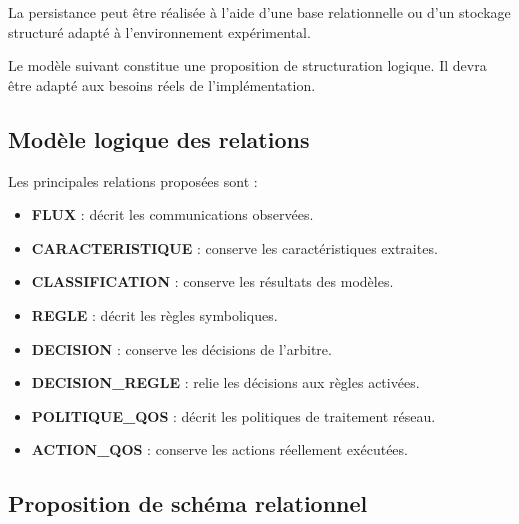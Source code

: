 La persistance peut être réalisée à l'aide d'une base relationnelle ou d'un stockage structuré adapté à l'environnement expérimental.

Le modèle suivant constitue une proposition de structuration logique. Il devra être adapté aux besoins réels de l'implémentation.

\subsection{Modèle logique des relations}

Les principales relations proposées sont :

\begin{itemize}
    \item \textbf{FLUX} : décrit les communications observées.
    \item \textbf{CARACTERISTIQUE} : conserve les caractéristiques extraites.
    \item \textbf{CLASSIFICATION} : conserve les résultats des modèles.
    \item \textbf{REGLE} : décrit les règles symboliques.
    \item \textbf{DECISION} : conserve les décisions de l'arbitre.
    \item \textbf{DECISION\_REGLE} : relie les décisions aux règles activées.
    \item \textbf{POLITIQUE\_QOS} : décrit les politiques de traitement réseau.
    \item \textbf{ACTION\_QOS} : conserve les actions réellement exécutées.
\end{itemize}

\subsection{Proposition de schéma relationnel}

